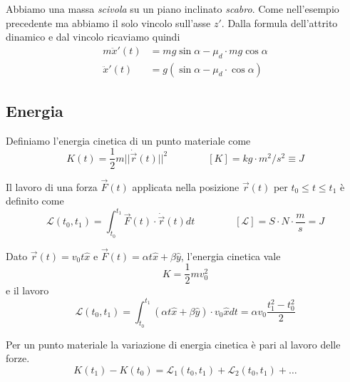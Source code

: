 \begin{example}
	Abbiamo una massa \textit{scivola} su un piano inclinato \textit{scabro}. Come nell'esempio precedente ma abbiamo il solo vincolo sull'asse $z'$. Dalla formula dell'attrito dinamico e dal vincolo ricaviamo quindi
	\begin{align*}
		m\ddot{x}'(t) & = mg\sin\alpha - \mu_d \cdot mg\cos\alpha \\
		\ddot{x}'(t) & = g(\sin\alpha - \mu_d \cdot \cos\alpha)
	\end{align*}
\end{example}

\subsection{Energia}
\begin{definition}
	Definiamo l'energia cinetica di un punto materiale come
	\begin{equation}
		K(t) = \frac{1}{2}m\lvert\lvert\dot{\vec{r}}(t)\rvert\rvert^2 \qquad\qquad [K]=kg\cdot m^2/s^2 \equiv J
	\end{equation}
\end{definition}

\begin{definition}[Lavoro]
	Il lavoro di una forza $\vec{F}(t)$ applicata nella posizione $\vec{r}(t)$ per $t_0 \leq  t \leq t_1$ è definito come
	\begin{equation}
		\label{eq:lavoro}
		\mathcal{L}(t_0,t_1) = \int_{t_0}^{t_1}\vec{F}(t) \cdot \dot{\vec{r}}(t) dt \qquad\qquad [\mathcal{L}] = S \cdot N \cdot \frac{m}{s} = J
	\end{equation}
\end{definition}

\begin{example}
	Dato $\vec{r}(t) = v_0 t \widehat{x}$ e $\vec{F}(t) = \alpha t \widehat{x}+\beta \widehat{y}$, l'energia cinetica vale
	\begin{equation*}
		K = \frac{1}{2}mv_0^2
	\end{equation*}
	e il lavoro
	\begin{equation*}
		\mathcal{L}(t_0,t_1) = \int_{t_0}^{t_1}(\alpha t \widehat{x}+\beta \widehat{y}) \cdot v_0 \widehat{x} dt = \alpha v_0 \frac{t_1^2-t_0^2}{2}
	\end{equation*}
\end{example}

\begin{theorem}
	Per un punto materiale la variazione di energia cinetica è pari al lavoro delle forze.
	\begin{equation}
		K(t_1) - K(t_0) = \mathcal{L}_1(t_0,t_1) + \mathcal{L}_2(t_0, t_1)+\ldots
	\end{equation}
\end{theorem}

